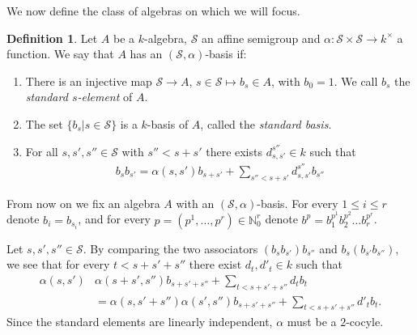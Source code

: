 \documentclass[11pt,fleqn]{article}
\theoremstyle{plain}
\theoremstyle{remark}
\theoremstyle{definition}
\newtheorem{Definition}[Theorem]{Definition}
\newcommand\NN{\mathbb N}
\renewcommand\to{\longrightarrow}
\renewcommand\S{\mathcal S}
\begin{document}
We now define the class of algebras on which we will focus.
\begin{Definition}
Let $A$ be a $k$-algebra, $\S$ an affine semigroup and $\alpha: \S \times \S \to k^\times$ 
a function. We say that $A$ has an $(\S,\alpha)$-basis if:
\begin{enumerate}
 \item There is an injective map $\S \to A$, $s \in \S \mapsto b_s \in
A$, with $b_0 = 1$. We call $b_s$ the \emph{standard $s$-element} of $A$.

 \item The set $\{b_s|s \in \S\}$ is a $k$-basis of $A$, called the \emph{standard basis}.

 \item For all $s,s',s'' \in \S$ with $s'' < s+ s'$ there exists $d_{s,s'}^{s''} \in k$
 such that
\begin{align*}
b_s b_{s'} = \alpha(s,s') b_{s+s'} + \sum_{s'' < s+s'} d_{s,s'}^{s''} b_{s''}
\end{align*}
\end{enumerate}
\end{Definition}
From now on we fix an algebra $A$ with an $(\S,\alpha)$-basis. For every $1 \leq i \leq r$ 
denote $b_i = b_{s_i}$, and for every $p = (p^1, \ldots, p^r) \in \NN_0^r$ denote $b^p =
b_1^{p^1} b_2^{p^2}\ldots b_r^{p^r}$.

Let $s, s', s'' \in \S$. By comparing the two associators $(b_s b_{s'})b_{s''}$ and $ b_s 
(b_{s'}b_{s''})$, we see that for every $t < s + s' + s''$ there exist $d_t, d'_t \in k$
such that
\begin{align*}
 \alpha(s,s')&\alpha(s + s',s'') b_{s+s'+s''} + \sum_{t < s+s'+s''} d_t b_t \\
  &=  \alpha(s,s'+s'')\alpha(s',s'') b_{s+s'+s''} + \sum_{t< s+s'+s''} d'_t b_t.
\end{align*}
Since the standard elements are linearly independent, $\alpha$ must be a
$2$-cocyle. 
\end{document}
